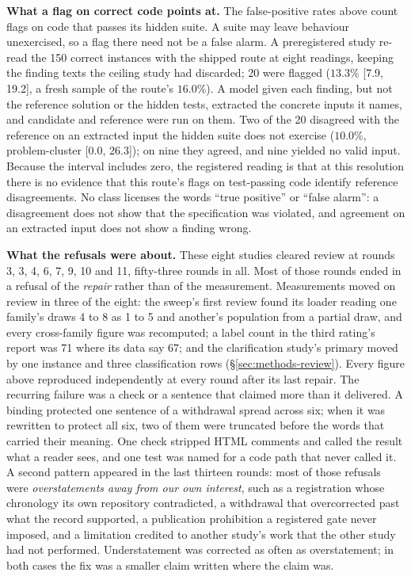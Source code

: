 \textbf{What a flag on correct code points at.} The false-positive rates above count flags on code
that passes its hidden suite. A suite may leave behaviour unexercised, so a flag there need not be
a false alarm. A preregistered study re-read the 150 correct instances with the shipped route at
eight readings, keeping the finding texts the ceiling study had discarded; 20 were flagged ($13.3\%$
[7.9, 19.2], a fresh sample of the route's $16.0\%$). A model given each finding, but not the
reference solution or the hidden tests, extracted the concrete inputs it names, and candidate and
reference were run on them. Two of the 20 disagreed with the reference on an extracted
input the hidden suite does not exercise ($10.0\%$, problem-cluster [0.0, 26.3]); on nine they
agreed, and nine yielded no valid input. Because the interval includes zero, the registered
reading is that at this resolution there is no evidence that this route's flags on test-passing
code identify reference disagreements. No class licenses the words ``true positive'' or ``false
alarm'': a disagreement does not show that the specification was violated, and agreement on an
extracted input does not show a finding wrong.

\textbf{What the refusals were about.} These eight studies cleared review at rounds 3, 3, 4, 6, 7,
9, 10 and 11, fifty-three rounds in all. Most of those rounds ended in a refusal of the
\emph{repair} rather than of the measurement. Measurements moved on review in three of the eight:
the sweep's first review found its loader reading one family's draws 4 to 8 as 1 to 5 and
another's population from a partial draw, and every cross-family figure was recomputed; a label
count in the third rating's report was 71 where its data say 67; and the clarification study's
primary moved by one instance and three classification rows (\S\ref{sec:methods-review}). Every
figure above reproduced independently at every round after its last repair. The recurring failure
was a check or a sentence that claimed more than it delivered. A binding protected one sentence of
a withdrawal spread across six; when it was rewritten to protect all six, two of them were
truncated before the words that carried their meaning. One check stripped HTML comments and called
the result what a reader sees, and one test was named for a code path that never called it. A
second pattern appeared in the last thirteen rounds: most of those refusals were
\emph{overstatements away from our own interest}, such as a registration whose chronology its own
repository contradicted, a withdrawal that overcorrected past what the record supported, a
publication prohibition a registered gate never imposed, and a limitation credited to another
study's work that the other study had not performed. Understatement was corrected as
often as overstatement; in both cases the fix was a smaller claim written where the claim was.

